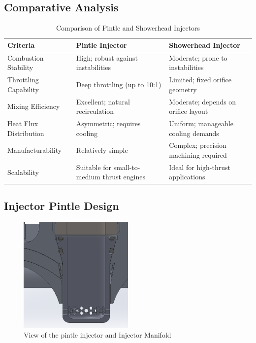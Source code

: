\subsection{Comparative Analysis}
\begin{table}[H]
    \centering
    \begin{tabularx}{\textwidth}{|X|X|X|}
        \hline
        \textbf{Criteria} & \textbf{Pintle Injector} & \textbf{Showerhead Injector} \\
        \hline
        Combustion Stability & High; robust against instabilities & Moderate; prone to instabilities \\
        \hline
        Throttling Capability & Deep throttling (up to 10:1) & Limited; fixed orifice geometry \\
        \hline
        Mixing Efficiency & Excellent; natural recirculation & Moderate; depends on orifice layout \\
        \hline
        Heat Flux Distribution & Asymmetric; requires cooling & Uniform; manageable cooling demands \\
        \hline
        Manufacturability & Relatively simple & Complex; precision machining required \\
        \hline
        Scalability & Suitable for small-to-medium thrust engines & Ideal for high-thrust applications \\
        \hline
    \end{tabularx}
    \caption{Comparison of Pintle and Showerhead Injectors}
    \label{tab:injector_comparison}
\end{table}



\subsection{Injector Pintle Design}

\begin{figure}[H]
    \centering
    \includegraphics[width=0.5\textwidth]{Images/PintleInjectorView.png}
    \caption{View of the pintle injector and Injector Manifold}
    \label{fig:pintle_injector}
\end{figure}

